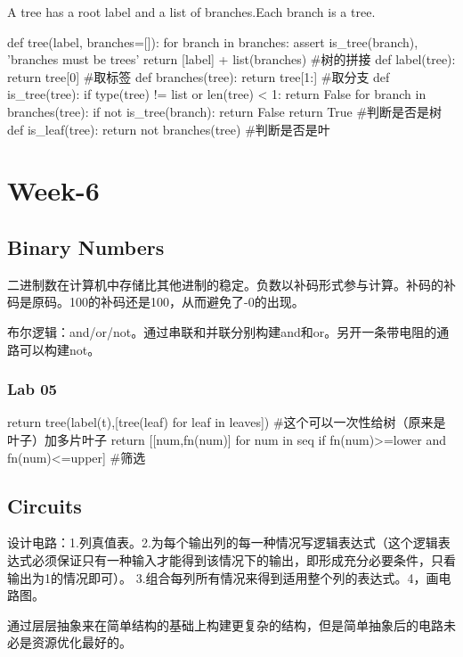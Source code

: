 \documentclass{ctexart}
\begin{document}
A tree has a root label and a list of branches.Each branch is a tree. 
\begin{python}
def tree(label, branches=[]):
    for branch in branches:
        assert is_tree(branch), 'branches must be trees'
    return [label] + list(branches)
#树的拼接
def label(tree):
    return tree[0]
#取标签
def branches(tree):
    return tree[1:]
#取分支
def is_tree(tree):
    if type(tree) != list or len(tree) < 1:
        return False
    for branch in branches(tree):
        if not is_tree(branch):
            return False
    return True
#判断是否是树
def is_leaf(tree):
    return not branches(tree)
#判断是否是叶
\end{python}

\section{Week-6}

\subsection{Binary Numbers}

二进制数在计算机中存储比其他进制的稳定。负数以补码形式参与计算。补码的补码是原码。100的补码还是100，从而避免了-0的出现。

布尔逻辑：and/or/not。通过串联和并联分别构建and和or。另开一条带电阻的通路可以构建not。

\subsubsection{Lab 05}

\begin{python}
    return tree(label(t),[tree(leaf) for leaf in leaves])
    #这个可以一次性给树（原来是叶子）加多片叶子
    return [[num,fn(num)] for num in seq if fn(num)>=lower and fn(num)<=upper]
    #筛选
\end{python}

\subsection{Circuits}

设计电路：1.列真值表。2.为每个输出列的每一种情况写逻辑表达式（这个逻辑表达式必须保证只有一种输入才能得到该情况下的输出，即形成充分必要条件，只看输出为1的情况即可）。
3.组合每列所有情况来得到适用整个列的表达式。4，画电路图。

通过层层抽象来在简单结构的基础上构建更复杂的结构，但是简单抽象后的电路未必是资源优化最好的。
\end{document}
